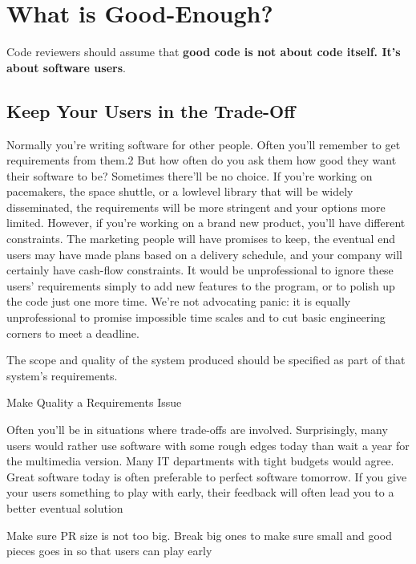 
\chapter{What is Good-Enough?}

Code reviewers should assume that \textbf{good code is not about code itself. It's about software users}.

\section{Keep Your Users in the Trade-Off}

Normally you’re writing software for other people. Often you’ll remember to get requirements from them.2 But how often do you ask them how good they want their software to be? Sometimes there’ll be no choice. If you’re working on pacemakers, the space shuttle, or a lowlevel library that will be widely disseminated, the requirements will be more stringent and your options more limited. However, if you’re working on a brand new product, you’ll have different constraints. The marketing people will have promises to keep, the eventual end users may have made plans based on a delivery schedule, and your company will certainly have cash-flow constraints. It would be unprofessional to ignore these users’ requirements simply to add new features to the program, or to polish up the code just one more time. We’re not advocating panic: it is equally unprofessional to promise impossible time scales and to cut basic engineering corners to meet a deadline.

The scope and quality of the system produced should be specified as part of that system’s requirements.

\begin{marker}
    Make Quality a Requirements Issue
\end{marker}

Often you’ll be in situations where trade-offs are involved. Surprisingly, many users would rather use software with some rough edges today than wait a year for the multimedia version. Many IT departments with tight budgets would agree. Great software today is often preferable to perfect software tomorrow. If you give your users something to play with early, their feedback will often lead you to a better eventual solution

\begin{marker}
    Make sure PR size is not too big. Break big ones to make sure small and good pieces goes in so that users can play early
\end{marker}